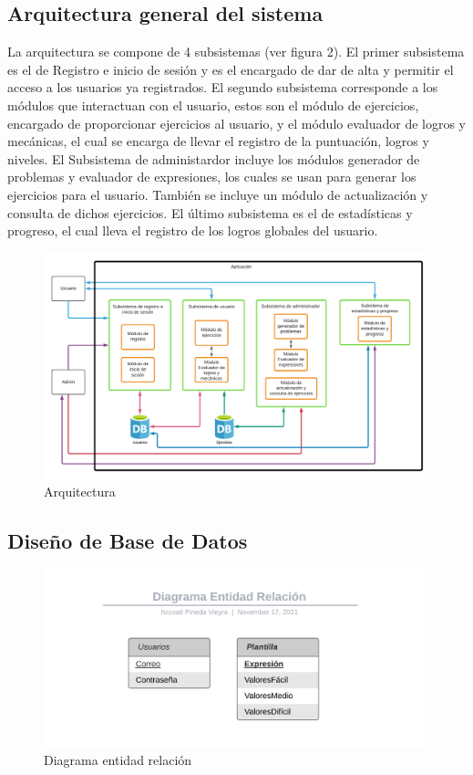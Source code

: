 \documentclass{article}
\begin{document}
\subsection{Arquitectura general del sistema}%
La arquitectura se compone de 4 subsistemas (ver figura 2).  El primer subsistema es el de Registro e inicio de sesión y es el encargado de dar de alta y permitir el acceso a los usuarios ya registrados. El segundo subsistema corresponde a los módulos que interactuan con el usuario, estos son el módulo de ejercicios, encargado de proporcionar ejercicios al usuario, y el módulo evaluador de logros y mecánicas, el cual se encarga de llevar el registro de la puntuación, logros y niveles. El Subsistema de administardor incluye los módulos generador de problemas y evaluador de expresiones, los cuales se usan para generar los ejercicios para el usuario. También se incluye un módulo de actualización y consulta de dichos ejercicios. El último subsistema es el de estadísticas y progreso, el cual lleva el registro de los logros globales del usuario.  
\begin{figure}[H]
    \centering
    \includegraphics[scale=0.65]{imgs/Arquitectura}
    \caption{Arquitectura}
\end{figure}

\subsection{Diseño de Base de Datos}%
\begin{figure}[H]
    \centering
    \includegraphics[scale=0.9]{imgs/BSD}
    \caption{Diagrama entidad relación}
\end{figure}
\end{document}
